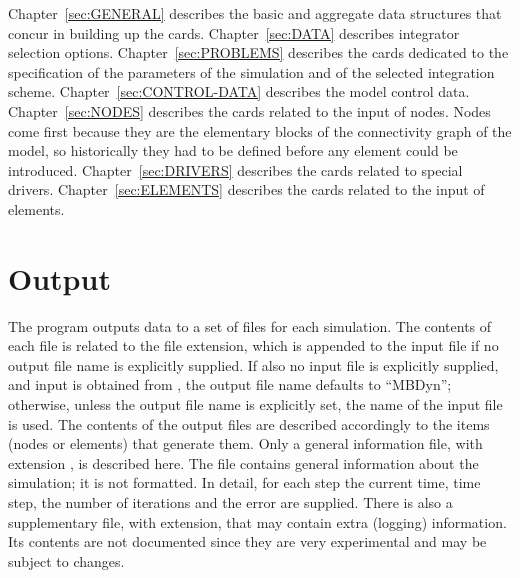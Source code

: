 Chapter~\ref{sec:GENERAL} describes the basic and aggregate
data structures that concur in building up the cards.
Chapter~\ref{sec:DATA} describes integrator selection options.
Chapter~\ref{sec:PROBLEMS} describes the cards dedicated
to the specification of the parameters of the simulation
and of the selected integration scheme.
Chapter~\ref{sec:CONTROL-DATA} describes the model control data.
Chapter~\ref{sec:NODES} describes the cards related to the input
of nodes.
Nodes come first because they are the elementary blocks 
of the connectivity graph of the model, so historically 
they had to be defined before any element could be introduced.
Chapter~\ref{sec:DRIVERS} describes the cards related 
to special drivers.
Chapter~\ref{sec:ELEMENTS} describes the cards related to the input
of elements.



\section{Output}
The program outputs data to a set of files for each simulation.
The contents of each file is related to the file extension,
which is appended to the input file if no output file name 
is explicitly supplied.
If also no input file is explicitly supplied, and input is obtained from 
, the output file name defaults to ``MBDyn''; otherwise, 
unless the output file name is explicitly set, the name 
of the input file is used.
The contents of the output files are described accordingly 
to the items (nodes or elements) that generate them.
Only a general information file, with extension , 
is described here. 
The file contains general information about the simulation; 
it is not formatted. 
In detail, for each step the current time, time step, the number of
iterations and the error are supplied.
There is also a supplementary file, with  extension,
that may contain extra (logging) information.
Its contents are not documented since they are very experimental
and may be subject to changes.


